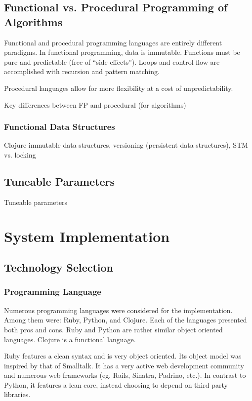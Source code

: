 \documentclass[12pt,letterpaper,oneside]{report}
\theoremstyle{definition}
\begin{document}
		\section{Functional vs. Procedural Programming of Algorithms}
			Functional and procedural programming languages are entirely different paradigms.	In functional programming, data is immutable.  Functions must be pure and predictable (free of ``side effects'').  Loops and control flow are accomplished with recursion and pattern matching.
			
			Procedural languages allow for more flexibility at a cost of unpredictability.  
			
			Key differences between FP and procedural (for algorithms)
			
			\subsection{Functional Data Structures}
				Clojure immutable data structures, versioning (persistent data structures), STM vs. locking
			
		\section{Tuneable Parameters}
			Tuneable parameters
	
	\chapter{System Implementation}
		\section{Technology Selection}
			
			
			\subsection{Programming Language}
				Numerous programming languages were considered for the implementation.  Among them were:  Ruby, Python, and Clojure.  Each of the languages presented both pros and cons.  Ruby and Python are rather similar object oriented languages.  Clojure is a functional language.
				
				Ruby features a clean syntax and is very object oriented.  Its object model was inspired by that of Smalltalk.  It has a very active web development community and numerous web frameworks (eg. Rails, Sinatra, Padrino, etc.).  In contrast to Python, it features a lean core, instead choosing to depend on third party libraries.
				
\end{document}
